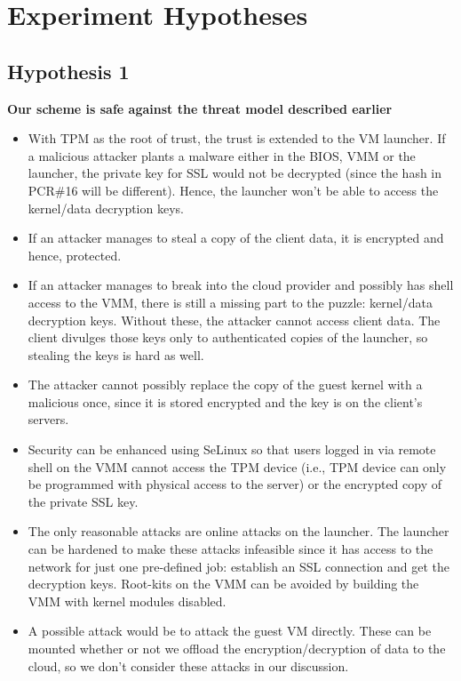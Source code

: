 \documentclass[11pt,pdftex]{article}
\begin{document}
\newpage
\section{Experiment Hypotheses}
\subsection{Hypothesis 1}
{\bf Our scheme is safe against the threat model described earlier}
\begin{itemize}
\item With TPM as the root of trust, the trust is extended to the VM launcher. If a malicious attacker plants a malware either in the BIOS, VMM or the launcher, the private key for SSL would not be decrypted (since the hash in PCR\#16 will be different). Hence, the launcher won't be able to access the kernel/data decryption keys. 
\item If an attacker manages to steal a copy of the client data, it is encrypted and hence, protected.
\item If an attacker manages to break into the cloud provider and possibly has shell access to the VMM, there is still a missing part to the puzzle: kernel/data decryption keys. Without these, the attacker cannot access client data. The client divulges those keys only to authenticated copies of the launcher, so stealing the keys is hard as well.
\item The attacker cannot possibly replace the copy of the guest kernel with a malicious once, since it is stored encrypted and the key is on the client's servers.
\item Security can be enhanced using SeLinux so that users logged in via remote shell on the VMM cannot access the TPM device (i.e., TPM device can only be programmed with physical access to the server) or the encrypted copy of the private SSL key.
\item The only reasonable attacks are online attacks on the launcher. The launcher can be hardened to make these attacks infeasible since it has access to the network for just one pre-defined job: establish an SSL connection and get the decryption keys. Root-kits on the VMM can be avoided by building the VMM with kernel modules disabled.
\item A possible attack would be to attack the guest VM directly. These can be mounted whether or not we offload the encryption/decryption of data to the cloud, so we don't consider these attacks in our discussion. 
\end{itemize}
\end{document}
